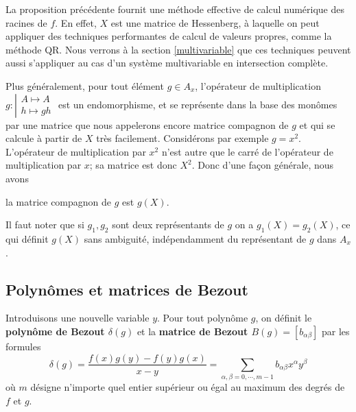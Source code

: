 \documentclass{standalone}
\begin{document}
\begin{rem}
La proposition précédente fournit une méthode effective de calcul numérique des racines de $f$. En effet, $X$ est une matrice de Hessenberg, à laquelle on peut appliquer des techniques performantes de calcul de valeurs propres, comme la méthode QR. Nous verrons à la section \ref{multivariable} que ces techniques peuvent aussi s'appliquer au cas d'un système multivariable en intersection complète.
\end{rem}
Plus généralement, pour tout élément $g\in A_x$, l'opérateur de multiplication
$g : \left\vert
\begin{array}{c}
A \mapsto A \\
h \mapsto gh
\end{array}
\right.$
est un endomorphisme, et se représente dans la base des monômes par une matrice que nous appelerons encore matrice compagnon de $g$ et qui se calcule à partir de $X$ très facilement. Considérons par exemple $g = x^2$. L'opérateur de multiplication par $x^2$ n'est autre que le carré de l'opérateur de multiplication par $x$; sa matrice est donc $X^2$. Donc d'une façon générale, nous avons
\begin{prop}
la matrice compagnon de $g$ est $g(X)$.
\end{prop}

\begin{rem}
Il faut noter que si $g_1, g_2$ sont deux représentants de $g$ on a $g_1(X) = g_2(X)$, ce qui définit $g(X)$ sans ambiguité, indépendamment du représentant de $g$ dans $A_x$.
\end{rem}

\subsection{Polynômes et matrices de Bezout}
\begin{defn}
\label{def_bez}
Introduisons une nouvelle variable $y$.
Pour tout polynôme $g$, on définit le {\bf polynôme de Bezout $\delta(g)$} et la {\bf matrice de Bezout $B(g) = [b_{\alpha\beta}]$}  par les formules
\begin{equation}
\delta(g) = \dfrac{f(x)g(y)-f(y)g(x)}{x-y} = \sum_{\alpha,\beta = 0, \cdots, m-1} b_{\alpha\beta} x^\alpha y^\beta
\end{equation}
où $m$ désigne n'importe quel entier supérieur ou égal au maximum des degrés de $f$ et $g$.
\end{defn}
\end{document}
